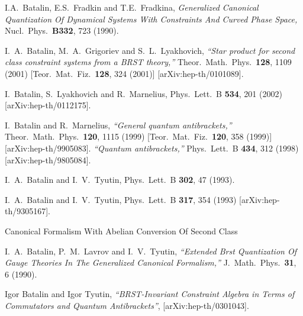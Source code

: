 \documentclass[a4paper,12pt]{amsart}
\numberwithin{equation}{section}
\begin{document}
\begin{thebibliography}{33}
I.A.~Batalin, E.S.~Fradkin and T.E.~Fradkina,
{\em Generalized Canonical Quantization Of Dynamical Systems With
  Constraints And Curved Phase Space,}
Nucl.\ Phys.\ {\bf B332}, 723 (1990).

I.~A.~Batalin, M.~A.~Grigoriev and S.~L.~Lyakhovich,
{\em ``Star product for second class constraint systems
from a BRST theory,''}
Theor.\ Math.\ Phys.\  {\bf 128}, 1109 (2001)
[Teor.\ Mat.\ Fiz.\  {\bf 128}, 324 (2001)]
[arXiv:hep-th/0101089].







I.~Batalin, S.~Lyakhovich and R.~Marnelius,
Phys.\ Lett.\ B {\bf 534}, 201 (2002)
[arXiv:hep-th/0112175].



I.~Batalin and R.~Marnelius,
{\em ``General quantum antibrackets,''}
Theor.\ Math.\ Phys.\  {\bf 120}, 1115 (1999)
[Teor.\ Mat.\ Fiz.\  {\bf 120}, 358 (1999)]
[arXiv:hep-th/9905083].
{\em ``Quantum antibrackets,''}
Phys.\ Lett.\ B {\bf 434}, 312 (1998)
[arXiv:hep-th/9805084].

I.~A.~Batalin and I.~V.~Tyutin,
Phys.\ Lett.\ B {\bf 302}, 47 (1993).

I.~A.~Batalin and I.~V.~Tyutin,
Phys.\ Lett.\ B {\bf 317}, 354 (1993)
[arXiv:hep-th/9305167].


Canonical Formalism With Abelian Conversion Of Second Class



I.~A.~Batalin, P.~M.~Lavrov and I.~V.~Tyutin,
{\em ``Extended Brst Quantization Of Gauge Theories In The Generalized 
Canonical Formalism,''}
J.\ Math.\ Phys.\  {\bf 31}, 6 (1990).

Igor Batalin and Igor Tyutin,
{\em ``BRST-Invariant Constraint Algebra in Terms of Commutators and Quantum 
Antibrackets''}, [arXiv:hep-th/0301043].


\end{thebibliography}
\end{document}
